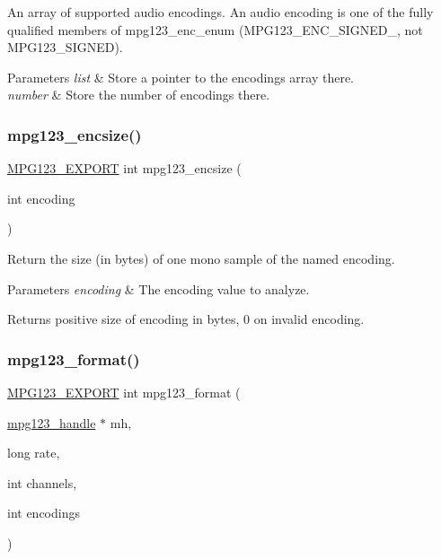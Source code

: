 An array of supported audio encodings. An audio encoding is one of the fully qualified members of mpg123\+\_\+enc\+\_\+enum (M\+P\+G123\+\_\+\+E\+N\+C\+\_\+\+S\+I\+G\+N\+E\+D\+\_, not M\+P\+G123\+\_\+\+S\+I\+G\+N\+ED). 
\begin{DoxyParams}{Parameters}
{\em list} & Store a pointer to the encodings array there. \\
\hline
{\em number} & Store the number of encodings there. \\
\hline
\end{DoxyParams}
\mbox{\label{group__mpg123__output_gaf12bd45d9040973c8c7b7b9411a530b5}} 
\subsubsection{\texorpdfstring{mpg123\_encsize()}{mpg123\_encsize()}}
{\footnotesize\ttfamily \mbox{\hyperlink{mpg123_8h_a2ba98cfba3f760879df70e755b2a61cc}{M\+P\+G123\+\_\+\+E\+X\+P\+O\+RT}} int mpg123\+\_\+encsize (\begin{DoxyParamCaption}\item[{int}]{encoding }\end{DoxyParamCaption})}

Return the size (in bytes) of one mono sample of the named encoding. 
\begin{DoxyParams}{Parameters}
{\em encoding} & The encoding value to analyze. \\
\hline
\end{DoxyParams}
\begin{DoxyReturn}{Returns}
positive size of encoding in bytes, 0 on invalid encoding. 
\end{DoxyReturn}
\mbox{\label{group__mpg123__output_gadad5794afc300a997e517dbe397dc2c7}} 
\subsubsection{\texorpdfstring{mpg123\_format()}{mpg123\_format()}}
{\footnotesize\ttfamily \mbox{\hyperlink{mpg123_8h_a2ba98cfba3f760879df70e755b2a61cc}{M\+P\+G123\+\_\+\+E\+X\+P\+O\+RT}} int mpg123\+\_\+format (\begin{DoxyParamCaption}\item[{\mbox{\hyperlink{group__mpg123__init_ga6728e2839a395f3a07d4514da659faca}{mpg123\+\_\+handle}} $\ast$}]{mh,  }\item[{long}]{rate,  }\item[{int}]{channels,  }\item[{int}]{encodings }\end{DoxyParamCaption})}

